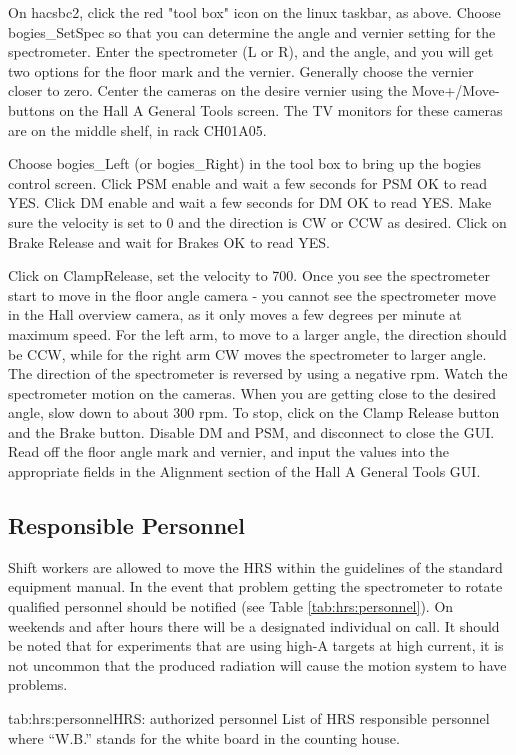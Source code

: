 {On hacsbc2, click the red "tool box" icon on the linux taskbar, as above. Choose 
bogies\_SetSpec so that you can determine the angle and vernier setting for the spectrometer.
Enter the spectrometer (L or R), and the angle, and you will get two options for the floor 
mark and the vernier. Generally choose the vernier closer to zero. Center the cameras on the 
desire vernier using the Move+/Move- buttons on the Hall A General Tools screen. The TV monitors 
for these cameras are on the middle shelf, in rack CH01A05.

Choose bogies\_Left (or bogies\_Right) in the tool box to bring up the bogies control screen. 
Click PSM enable and wait a few seconds for PSM OK to read YES. 
Click DM enable and wait a few seconds for DM OK to read YES.
Make sure the velocity is set to 0 and the direction is CW or CCW as desired. Click on Brake Release 
and wait for Brakes OK to read YES.

Click on ClampRelease, set the velocity to 700. Once you see the spectrometer start to move in the 
floor angle camera - you cannot see the spectrometer move in the Hall overview camera, as it only 
moves a few degrees per minute at maximum speed. For the left arm, to move to a larger angle, the 
direction should be CCW, while for the right arm CW moves the spectrometer to larger angle. The 
direction of the spectrometer is reversed by using a negative rpm. Watch the spectrometer motion 
on the cameras. When you are getting close to the desired angle, slow down to about 300 rpm. 
To stop, click on the Clamp Release button and the Brake button. Disable DM and PSM, and disconnect 
to close the GUI. Read off the floor angle mark and vernier, and input the values into the appropriate 
fields in the Alignment section of the Hall A General Tools GUI. 
}

\begin{safetyen}{0}{0}
\subsection{Responsible Personnel}

Shift workers are allowed to move the HRS within the guidelines of the standard equipment manual.
In the event that problem getting the spectrometer to rotate
qualified personnel should be notified
(see Table \ref{tab:hrs:personnel}).  
On weekends and after hours there will be a 
designated individual on call.
It should be noted that for experiments that are using high-A targets at high current, it is
not uncommon that the produced radiation will cause the motion system to have problems.

\begin{namestab}{tab:hrs:personnel}{HRS: authorized personnel}{%
      List of HRS responsible personnel where ``W.B.'' stands for the white board 
      in the counting house.}
   \EdFolts{}
   \JackSegal{}
   \HeidiFansler{}
   \JessieButler{}
   \AndrewLumanog{}
   \JasonGlorioso{}
   \MahlonLong{}
\end{namestab}

\end{safetyen}

